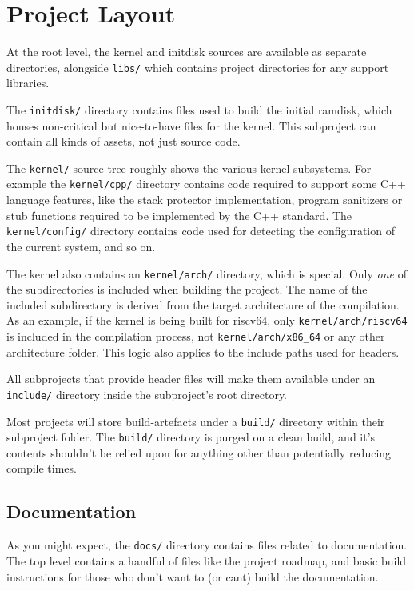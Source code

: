 \section{Project Layout}
At the root level, the kernel and initdisk sources are available as separate directories, alongside \verb|libs/| which contains project directories for any support libraries.

The \verb|initdisk/| directory contains files used to build the initial ramdisk, which houses non-critical but nice-to-have files for the kernel. This subproject can contain all kinds of assets, not just source code.

The \verb|kernel/| source tree roughly shows the various kernel subsystems. For example the \verb|kernel/cpp/| directory contains code required to support some C++ language features, like the stack protector implementation, program sanitizers or stub functions required to be implemented by the C++ standard. The \verb|kernel/config/| directory contains code used for detecting the configuration of the current system, and so on.

The kernel also contains an \verb|kernel/arch/| directory, which is special. Only \textit{one} of the subdirectories is included when building the project. The name of the included subdirectory is derived from the target architecture of the compilation. As an example, if the kernel is being built for riscv64, only \verb|kernel/arch/riscv64| is included in the compilation process, not \verb|kernel/arch/x86_64| or any other architecture folder. This logic also applies to the include paths used for headers.

All subprojects that provide header files will make them available under an \verb|include/| directory inside the subproject's root directory.

Most projects will store build-artefacts under a \verb|build/| directory within their subproject folder. The \verb|build/| directory is purged on a clean build, and it's contents shouldn't be relied upon for anything other than potentially reducing compile times.

\subsection{Documentation}
As you might expect, the \verb|docs/| directory contains files related to documentation. The top level contains a handful of files like the project roadmap, and basic build instructions for those who don't want to (or cant) build the documentation.

